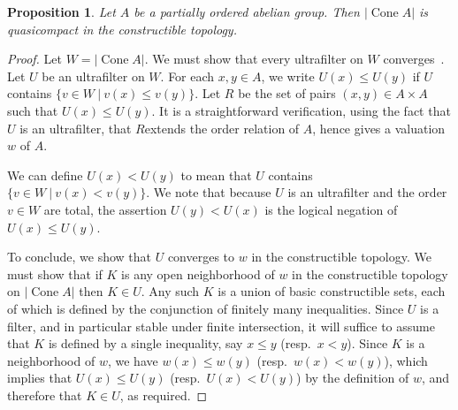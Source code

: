 \documentclass[10pt]{article}
\numberwithin{equation}{section}
\newtheorem{proposition}[paragraph]{Proposition}
\theoremstyle{definition}
\theoremstyle{remark}
\def\Cone{\operatorname{Cone}}
\newcommand{\utopcone}[1]{\left\vert\Cone #1 \right\vert}
\begin{document}
\begin{proposition} \label{prop:23}
	Let $A$ be a partially ordered abelian group.  Then $\utopcone A$ is quasicompact in the constructible topology.
\end{proposition}
\begin{proof}
	Let $W = \utopcone A$.  We must show that every ultrafilter on $W$ converges~\cite[D\'efinition~I.9.1.1]{Bourbaki-TG}. Let $U$ be an ultrafilter on $W$.  For each $x, y \in A$, we write $U(x) \leq U(y)$ if $U$ contains 
	$
		\{ v \in W \: \big| \: v(x) \leq v(y) \} .
	$
	Let $R$ be the set of pairs $(x,y) \in A \times A$ such that $U(x) \leq U(y)$.  It is a straightforward verification, using the fact that $U$ is an ultrafilter, that $R$extends the order relation of $A$, hence gives a valuation $w$ of $A$.
	
	

	We can define $U(x) < U(y)$ to mean that $U$ contains $\{ v \in W \: \big| \: v(x) < v(y) \}$.  We note that because $U$ is an ultrafilter and the order $v \in W$ are total, the assertion $U(y) < U(x)$ is the logical negation of $U(x) \leq U(y)$.


	




	To conclude, we show that $U$ converges to $w$ in the constructible topology.  We must show that if $K$ is any open neighborhood of $w$ in the constructible topology on $\utopcone A$ then $K \in U$.  Any such $K$ is a union of basic constructible sets, each of which is defined by the conjunction of finitely many inequalities.  Since $U$ is a filter, and in particular stable under finite intersection, it will suffice to assume that $K$ is defined by a single inequality, say $x \leq y$ (resp.\ $x < y$).  Since $K$ is a neighborhood of $w$, we have $w(x) \leq w(y)$ (resp.\ $w(x) < w(y)$), which implies that $U(x) \leq U(y)$ (resp.\ $U(x) < U(y)$) by the definition of $w$, and therefore that $K \in U$, as required.
\end{proof}
\end{document}
